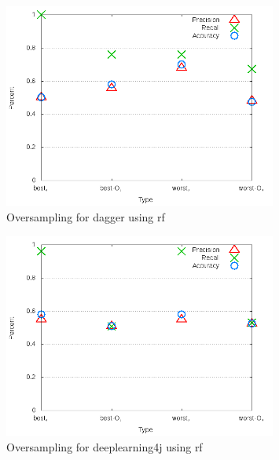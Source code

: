 \begin{figure}[!t]
\centering
\includegraphics[width=0.8\textwidth]{images/rf/test_4/dagger_sample_range.png}
\caption{Oversampling for dagger using \gls{rf}}
\label{fig:test_4_dagger_rf}
\end{figure}

\begin{figure}[!t]
\centering
\includegraphics[width=0.8\textwidth]{images/rf/test_4/deeplearning4j_sample_range.png}
\caption{Oversampling for deeplearning4j using \gls{rf}}
\label{fig:test_4_deeplearning4j_rf}
\end{figure}

